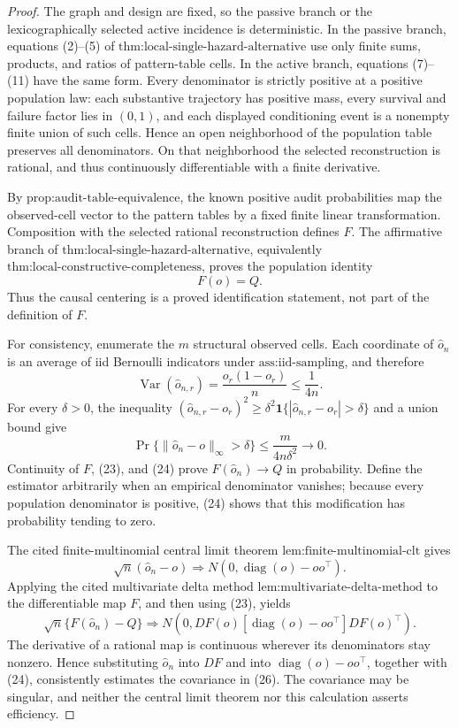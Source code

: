 \documentclass{article}
\begin{document}
\begin{proof}
The graph and design are fixed, so the passive branch or the lexicographically selected active incidence is deterministic.  In the passive branch, equations (2)--(5) of
\(\text{thm:local-single-hazard-alternative}\) use only finite sums, products, and ratios of pattern-table cells.  In the active branch, equations (7)--(11) have the same form.  Every denominator is strictly positive at a positive population law: each substantive trajectory has positive mass, every survival and failure factor lies in \((0,1)\), and each displayed conditioning event is a nonempty finite union of such cells.  Hence an open neighborhood of the population table preserves all denominators.  On that neighborhood the selected reconstruction is rational, and thus continuously differentiable with a finite derivative.

By \(\text{prop:audit-table-equivalence}\), the known positive audit probabilities map the observed-cell vector to the pattern tables by a fixed finite linear transformation.  Composition with the selected rational reconstruction defines \(F\).  The affirmative branch of
\(\text{thm:local-single-hazard-alternative}\), equivalently
\(\text{thm:local-constructive-completeness}\), proves the population identity
\[
F(o)=Q.
\tag{23}
\]
Thus the causal centering is a proved identification statement, not part of the definition of \(F\).

For consistency, enumerate the \(m\) structural observed cells.  Each coordinate of \(\widehat o_n\) is an average of iid Bernoulli indicators under
\(\text{ass:iid-sampling}\), and therefore
\[
\operatorname{Var}(\widehat o_{n,r})
=\frac{o_r(1-o_r)}n\le\frac1{4n}.
\]
For every \(\delta>0\), the inequality
\((\widehat o_{n,r}-o_r)^2\ge
\delta^2\mathbf 1\{|\widehat o_{n,r}-o_r|>\delta\}\) and a union bound give
\[
\Pr\{\|\widehat o_n-o\|_\infty>\delta\}
\le\frac{m}{4n\delta^2}\longrightarrow0.
\tag{24}
\]
Continuity of \(F\), (23), and (24) prove
\(F(\widehat o_n)\to Q\) in probability.  Define the estimator arbitrarily when an empirical denominator vanishes; because every population denominator is positive, (24) shows that this modification has probability tending to zero.

The cited finite-multinomial central limit theorem
\(\text{lem:finite-multinomial-clt}\) gives
\[
\sqrt n(\widehat o_n-o)
\Rightarrow N(0,\operatorname{diag}(o)-oo^\top).
\tag{25}
\]
Applying the cited multivariate delta method
\(\text{lem:multivariate-delta-method}\) to the differentiable map \(F\), and then using (23), yields
\[
\sqrt n\{F(\widehat o_n)-Q\}
\Rightarrow
N\!\left(0,DF(o)[\operatorname{diag}(o)-oo^\top]DF(o)^\top\right).
\tag{26}
\]
The derivative of a rational map is continuous wherever its denominators stay nonzero.  Hence substituting \(\widehat o_n\) into \(DF\) and into
\(\operatorname{diag}(o)-oo^\top\), together with (24), consistently estimates the covariance in (26).  The covariance may be singular, and neither the central limit theorem nor this calculation asserts efficiency.
\end{proof}
\end{document}

